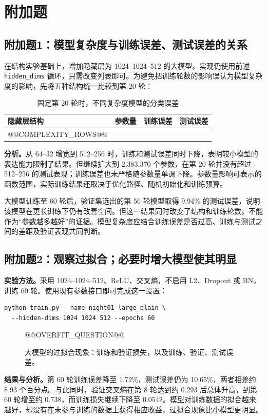\documentclass[UTF8,11pt,a4paper,fontset=fandol]{ctexart}
\newcommand{\question}[1]{\Needspace{14\baselineskip}\subsection{#1}}
\begin{document}
\section{附加题}
\question{附加题1：模型复杂度与训练误差、测试误差的关系}
在结构实验基础上，增加隐藏层为 1024--1024--512 的大模型。实现仍使用前述 \texttt{hidden\_dims} 循环，只需改变列表即可。为避免把训练轮数的影响误认为模型复杂度的影响，先将五种结构统一比较到第 20 轮：
\begin{table}[H]\centering\small
\caption{固定第 20 轮时，不同复杂度模型的分类误差}
\begin{tabular}{lrrr}\toprule
隐藏层结构 & 参数量 & 训练误差 & 测试误差 \\\midrule
@@COMPLEXITY_ROWS@@
\bottomrule\end{tabular}
\end{table}
\textbf{分析。}从 64--32 增宽到 512--256 时，训练和测试误差同时下降，表明较小模型的表达能力限制了结果。但继续扩大到 2,383,370 个参数，在第 20 轮并没有超过 512--256 的测试表现；训练误差也未严格随参数量单调下降。参数量影响可表示的函数范围，实际训练结果还取决于优化路径、随机初始化和训练预算。

大模型训练至 60 轮后，验证集选出的第 56 轮模型取得 9.94\% 的测试误差，说明该模型在更长训练下仍有改善空间。但这一结果同时改变了结构和训练轮数，不能作为“参数越多越好”的证据。模型复杂度应结合训练误差是否过高、训练与测试之间的差距及验证表现共同判断。

\question{附加题2：观察过拟合；必要时增大模型使其明显}
\textbf{实验方法。}采用 1024--1024--512、ReLU、交叉熵，不启用 L2、Dropout 或 BN，训练 60 轮。使用现有参数接口即可完成这一设置：
\par\noindent\begin{minipage}{\linewidth}
\begin{lstlisting}[language={}]
python train.py --name night01_large_plain \
  --hidden-dims 1024 1024 512 --epochs 60
\end{lstlisting}
\end{minipage}\par
\begin{figure}[H]\centering
@@OVERFIT_QUESTION@@
\caption{大模型的过拟合现象：训练和验证损失，以及训练、验证、测试误差。}\label{fig:overfit}
\end{figure}
\textbf{结果与分析。}第 60 轮训练误差降至 1.72\%，测试误差仍为 10.65\%，两者相差约 8.93 个百分点。与此同时，验证交叉熵在第 8 轮达到约 0.293 后总体升高，到第 60 轮增至约 0.738，而训练损失继续下降至 0.0542。模型对训练数据的拟合越来越好，却没有在未参与训练的数据上获得相应收益，过拟合现象比小模型更明显。
\end{document}
